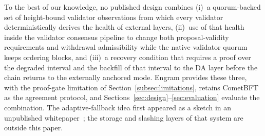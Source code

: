 To the best of our knowledge, no published design combines (i)~a quorum-backed
set of height-bound validator observations from which every validator
deterministically derives the health of external layers, (ii)~use of that
health inside the validator consensus pipeline to change both proposal-validity
requirements and withdrawal admissibility while the native validator quorum
keeps ordering blocks, and (iii)~a recovery condition that requires a proof over the degraded
interval and the backfill of that interval to the DA layer before the chain
returns to the externally anchored mode. Engram provides these three, with the proof-gate limitation of
Section~\ref{subsec:limitations}, retains CometBFT as the
agreement protocol, and Sections~\ref{sec:design}--\ref{sec:evaluation}
evaluate the combination. The adaptive-fallback idea first appeared as a sketch in an unpublished
whitepaper~\cite{engram2026whitepaper}; the storage and slashing layers of that
system are outside this paper.

